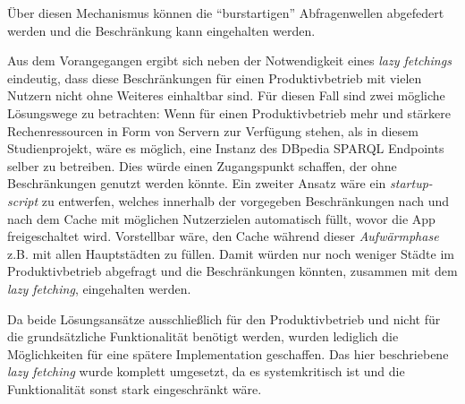 	Über diesen Mechanismus können die \enquote{burstartigen} Abfragenwellen abgefedert werden und die Beschränkung kann eingehalten werden.
	
	\vspace{0.25cm}
	
	Aus dem Vorangegangen ergibt sich neben der Notwendigkeit eines \textit{lazy fetchings} eindeutig, dass diese Beschränkungen für einen Produktivbetrieb mit vielen Nutzern nicht ohne Weiteres einhaltbar sind. Für diesen Fall sind zwei mögliche Lösungswege zu betrachten: Wenn für einen Produktivbetrieb mehr und stärkere Rechenressourcen in Form von Servern zur Verfügung stehen, als in diesem Studienprojekt, wäre es möglich, eine Instanz des DBpedia SPARQL Endpoints selber zu betreiben. Dies würde einen Zugangspunkt schaffen, der ohne Beschränkungen genutzt werden könnte. Ein zweiter Ansatz wäre ein \textit{startup-script} zu entwerfen, welches innerhalb der vorgegeben Beschränkungen nach und nach dem Cache mit möglichen Nutzerzielen automatisch füllt, wovor die App freigeschaltet wird. Vorstellbar wäre, den Cache während dieser \textit{Aufwärmphase} z.B. mit allen Hauptstädten zu füllen. Damit würden nur noch weniger Städte im Produktivbetrieb abgefragt und die Beschränkungen könnten, zusammen mit dem \textit{lazy fetching}, eingehalten werden.
	
	\vspace{0.25cm}
	
	Da beide Lösungsansätze ausschließlich für den Produktivbetrieb und nicht für die grundsätzliche Funktionalität benötigt werden, wurden lediglich die Möglichkeiten für eine spätere Implementation geschaffen. Das hier beschriebene \textit{lazy fetching} wurde komplett umgesetzt, da es systemkritisch ist und die Funktionalität sonst stark eingeschränkt wäre.      